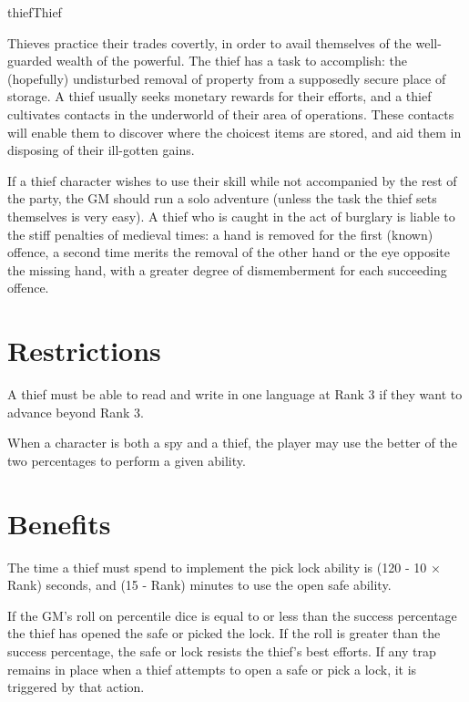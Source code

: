 \begin{Skill}[1.2]{thief}{Thief}

Thieves practice their trades covertly, in order to avail themselves
of the well-guarded wealth of the powerful.  The thief has a task to
accomplish: the (hopefully) undisturbed removal of property from a
supposedly secure place of storage.  A thief usually seeks monetary
rewards for their efforts, and a thief cultivates contacts in the
underworld of their area of operations. These contacts will enable
them to discover where the choicest items are stored, and aid them in
disposing of their ill-gotten gains.

If a thief character wishes to use their skill while not accompanied
by the rest of the party, the GM should run a solo adventure (unless
the task the thief sets themselves is very easy).  A thief who is
caught in the act of burglary is liable to the stiff penalties of
medieval times: a hand is removed for the first (known) offence, a
second time merits the removal of the other hand or the eye opposite
the missing hand, with a greater degree of dismemberment for each
succeeding offence.

\section{Restrictions}

A thief must be able to read and write in one language at Rank 3 if
they want to advance beyond Rank 3.

When a character is both a spy and a thief, the player may use the
better of the two percentages to perform a given ability.

\section{Benefits}
\label{thief:benefits}

The time a thief must spend to implement the pick lock ability is (120
- 10 × Rank) seconds, and (15 - Rank) minutes to use the open safe
ability.

If the GM’s roll on percentile dice is equal to or less than the
success percentage the thief has opened the safe or picked the lock.
If the roll is greater than the success percentage, the safe or lock
resists the thief’s best efforts.  If any trap remains in place when a
thief attempts to open a safe or pick a lock, it is triggered by that
action.


\end{Skill}

